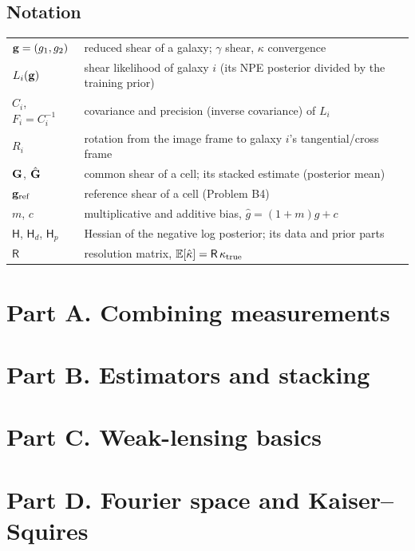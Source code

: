 \subsection*{Notation}
\begin{center}
\begin{tabular}{@{}ll@{}}
\toprule
$\mathbf{g} = (g_1, g_2)$ & reduced shear of a galaxy; $\gamma$ shear, $\kappa$ convergence \\
$L_i(\mathbf{g})$ & shear likelihood of galaxy $i$ (its NPE posterior divided by the training prior) \\
$C_i$, $F_i = C_i^{-1}$ & covariance and precision (inverse covariance) of $L_i$ \\
$R_i$ & rotation from the image frame to galaxy $i$'s tangential/cross frame \\
$\mathbf{G}$, $\hat{\mathbf{G}}$ & common shear of a cell; its stacked estimate (posterior mean) \\
$\mathbf{g}_{\rm ref}$ & reference shear of a cell (Problem B4) \\
$m$, $c$ & multiplicative and additive bias, $\hat g = (1+m)g + c$ \\
$\mathsf H$, $\mathsf H_d$, $\mathsf H_p$ & Hessian of the negative log posterior; its data and prior parts \\
$\mathsf R$ & resolution matrix, $\mathbb{E}[\hat\kappa] = \mathsf R\,\kappa_{\rm true}$ \\
\bottomrule
\end{tabular}
\end{center}

\tableofcontents
\clearpage

\section*{Part A. Combining measurements}

\section*{Part B. Estimators and stacking}

\section*{Part C. Weak-lensing basics}

\section*{Part D. Fourier space and Kaiser--Squires}

